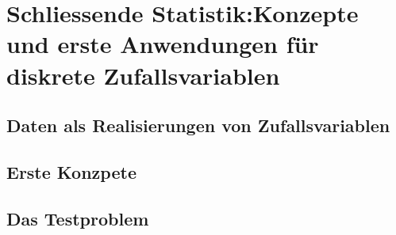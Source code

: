 \chapter{Schliessende Statistik:Konzepte und erste Anwendungen für diskrete Zufallsvariablen}
\section{Daten als Realisierungen von Zufallsvariablen}
\label{sec8.1}
\section{Erste Konzpete}
\section{Das Testproblem}
